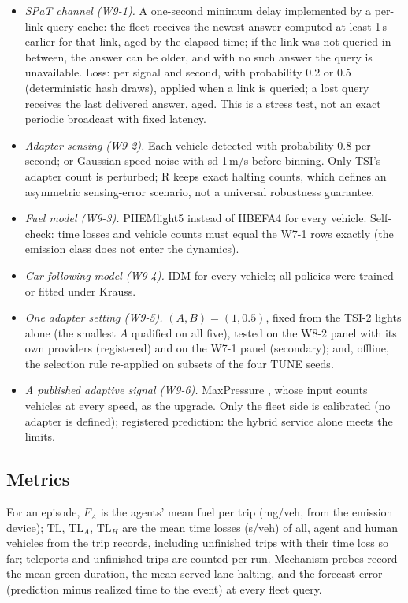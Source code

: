 \begin{itemize}\setlength\itemsep{1pt}
\item \emph{SPaT channel (W9-1).} A one-second minimum delay implemented by a per-link query cache: the fleet receives the newest answer
computed at least 1\,s earlier for that link, aged by the elapsed time; if the link was not queried in between, the answer can be older,
and with no such answer the query is unavailable. Loss: per signal and second, with probability 0.2 or 0.5 (deterministic hash draws),
applied when a link is queried; a lost query receives the last delivered answer, aged. This is a stress test, not an exact periodic
broadcast with fixed latency.
\item \emph{Adapter sensing (W9-2).} Each vehicle detected with probability 0.8 per second; or Gaussian speed noise with sd 1\,m/s before
binning. Only TSI's adapter count is perturbed; R keeps exact halting counts, which defines an asymmetric sensing-error scenario, not a universal robustness guarantee.
\item \emph{Fuel model (W9-3).} PHEMlight5 instead of HBEFA4 for every vehicle. Self-check: time losses and vehicle counts must equal the
W7-1 rows exactly (the emission class does not enter the dynamics).
\item \emph{Car-following model (W9-4).} IDM for every vehicle; all policies were trained or fitted under Krauss.
\item \emph{One adapter setting (W9-5).} $(A,B)=(1,0.5)$, fixed from the TSI-2 lights alone (the smallest $A$ qualified on all five),
tested on the W8-2 panel with its own providers (registered) and on the W7-1 panel (secondary); and, offline, the selection rule
re-applied on subsets of the four TUNE seeds.
\item \emph{A published adaptive signal (W9-6).} MaxPressure \cite{varaiya2013}, whose input counts vehicles at every speed, as the
upgrade. Only the fleet side is calibrated (no adapter is defined); registered prediction: the hybrid service alone meets the limits.
\end{itemize}

\subsection{Metrics}
For an episode, $F_A$ is the agents' mean fuel per trip (mg/veh, from the emission device); $\mathrm{TL}$, $\mathrm{TL}_A$, $\mathrm{TL}_H$ are the mean
time losses (s/veh) of all, agent and human vehicles from the trip records, including unfinished trips with their time loss so far;
teleports and unfinished trips are counted per run. Mechanism probes record the mean green duration, the mean served-lane halting, and the
forecast error (prediction minus realized time to the event) at every fleet query.

